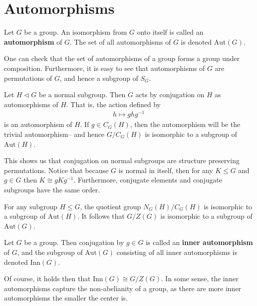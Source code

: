 \documentclass{memoir}
\begin{document}



\section{Automorphisms}
\label{sub:automorphisms}

\begin{defn}[Automorphism]
	Let \(G\) be a group. An isomorphism from \(G\) onto itself is called an \textbf{automorphism} of \(G\). The set of all automorphisms of \(G\) is denoted \(\textrm{Aut}(G)\).
\end{defn}
One can check that the set of automorphisms of a group forms a group under composition. Furthermore, it is easy to see that automorphisms of \(G\) are permutations of \(G\), and hence a subgroup of \(S_G\).

\begin{prop}
	Let \(H \triangleleft G\) be a normal subgroup. Then \(G\) acts by conjugation on \(H\) as automorphisms of \(H\). That is, the action defined by
	\begin{align*}
		h\mapsto ghg^{-1}
	\end{align*}
	is an automorphism of \(H\). If \(g \in C_G(H)\), then the automorphism will be the trivial automorphism-- and hence \(G / C_G(H)\) is isomorphic to a subgroup of \(\textrm{Aut}(H)\).
\end{prop}
This shows us that conjugation on normal subgroups are structure preserving permutations. Notice that because \(G\) is normal in itself, then for any \(K\leq G\) and \(g \in G\) then \(K \cong g K g^{-1}\). Furthermore, conjugate elements and conjugate subgroups have the same order.

\begin{cor}
	For any subgroup \(H\leq G\), the quotient group \(N_G(H) / C_G(H)\) is isomorphic to a subgroup of \(\textrm{Aut}(H)\). It follows that \(G / Z(G)\) is isomorphic to a subgroup of \(\textrm{Aut}(G)\).
\end{cor}

\begin{defn}
	Let \(G\) be a group. Then conjugation by \(g \in G\) is called an \textbf{inner automorphism} of \(G\), and the subgroup of \(\textrm{Aut}(G)\) consisting of all inner automorphisms is denoted \(\textrm{Inn}(G)\).
\end{defn}
Of course, it holds then that \(\textrm{Inn}(G) \cong G / Z(G)\). In some sense, the inner automorphisms capture the non-abelianity of a group, as there are more inner automorphisms the smaller the center is.\\
\end{document}
